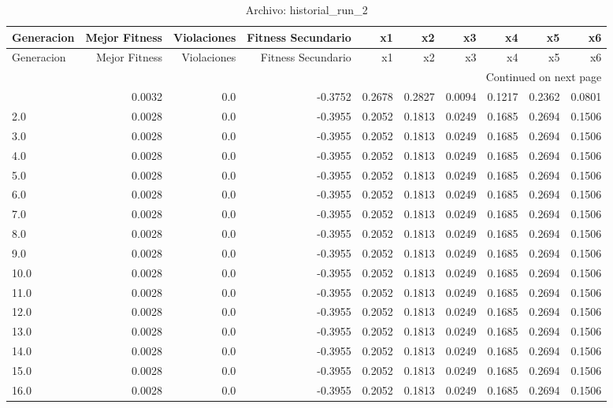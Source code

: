 \begin{longtable}{lrrrrrrrrr}
\caption{Archivo: historial\_run\_2}\label{tab:historial_run_2} \\
\toprule
Generacion & Mejor Fitness & Violaciones & Fitness Secundario & x1 & x2 & x3 & x4 & x5 & x6 \\
\midrule
\endfirsthead
\toprule
Generacion & Mejor Fitness & Violaciones & Fitness Secundario & x1 & x2 & x3 & x4 & x5 & x6 \\
\midrule
\endhead
\midrule
\multicolumn{10}{r}{Continued on next page} \\
\midrule
\endfoot
\bottomrule
\endlastfoot
1.0 & 0.0032 & 0.0 & -0.3752 & 0.2678 & 0.2827 & 0.0094 & 0.1217 & 0.2362 & 0.0801 \\
2.0 & 0.0028 & 0.0 & -0.3955 & 0.2052 & 0.1813 & 0.0249 & 0.1685 & 0.2694 & 0.1506 \\
3.0 & 0.0028 & 0.0 & -0.3955 & 0.2052 & 0.1813 & 0.0249 & 0.1685 & 0.2694 & 0.1506 \\
4.0 & 0.0028 & 0.0 & -0.3955 & 0.2052 & 0.1813 & 0.0249 & 0.1685 & 0.2694 & 0.1506 \\
5.0 & 0.0028 & 0.0 & -0.3955 & 0.2052 & 0.1813 & 0.0249 & 0.1685 & 0.2694 & 0.1506 \\
6.0 & 0.0028 & 0.0 & -0.3955 & 0.2052 & 0.1813 & 0.0249 & 0.1685 & 0.2694 & 0.1506 \\
7.0 & 0.0028 & 0.0 & -0.3955 & 0.2052 & 0.1813 & 0.0249 & 0.1685 & 0.2694 & 0.1506 \\
8.0 & 0.0028 & 0.0 & -0.3955 & 0.2052 & 0.1813 & 0.0249 & 0.1685 & 0.2694 & 0.1506 \\
9.0 & 0.0028 & 0.0 & -0.3955 & 0.2052 & 0.1813 & 0.0249 & 0.1685 & 0.2694 & 0.1506 \\
10.0 & 0.0028 & 0.0 & -0.3955 & 0.2052 & 0.1813 & 0.0249 & 0.1685 & 0.2694 & 0.1506 \\
11.0 & 0.0028 & 0.0 & -0.3955 & 0.2052 & 0.1813 & 0.0249 & 0.1685 & 0.2694 & 0.1506 \\
12.0 & 0.0028 & 0.0 & -0.3955 & 0.2052 & 0.1813 & 0.0249 & 0.1685 & 0.2694 & 0.1506 \\
13.0 & 0.0028 & 0.0 & -0.3955 & 0.2052 & 0.1813 & 0.0249 & 0.1685 & 0.2694 & 0.1506 \\
14.0 & 0.0028 & 0.0 & -0.3955 & 0.2052 & 0.1813 & 0.0249 & 0.1685 & 0.2694 & 0.1506 \\
15.0 & 0.0028 & 0.0 & -0.3955 & 0.2052 & 0.1813 & 0.0249 & 0.1685 & 0.2694 & 0.1506 \\
16.0 & 0.0028 & 0.0 & -0.3955 & 0.2052 & 0.1813 & 0.0249 & 0.1685 & 0.2694 & 0.1506 \\

\end{longtable}
